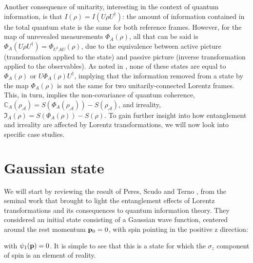 \documentclass[12pt,a4paper,notitlepage]{report}
\begin{document}

Another consequence of unitarity, interesting in the context of quantum information, is that $I(\rho) = I(U\rho U^\dagger)$: the amount of information contained in the total quantum state is the same for both reference frames. However, for the map of unrevealed measurements $\Phi_A(\rho)$, all that can be said is $\Phi_A(U\rho U^\dagger) = \Phi_{U^\dagger AU}(\rho)$, due to the equivalence between active picture (transformation applied to the state) and passive picture (inverse transformation applied to the observables). As noted in \cite{savi_angelo_2021}, none of these states are equal to $\Phi_A(\rho)$ or $U\Phi_A(\rho)U^\dagger$, implying that the information removed from a state by the map $\Phi_A(\rho)$ is not the same for two unitarily-connected Lorentz frames. This, in turn, implies the non-covariance of quantum coherence, $\mathbb{C}_A(\rho_\mathcal{A}) = S(\Phi_A(\rho_\mathcal{A})) - S(\rho_\mathcal{A})$, and irreality, $\mathfrak{I}_A(\rho) = S(\Phi_A(\rho)) - S(\rho)$. To gain further insight into how entanglement and irreality are affected by Lorentz transformations, we will now look into specific case studies.

\section{Gaussian state}

We will start by reviewing the result of Peres, Scudo and Terno \cite{peres2002}, from the seminal work that brought to light the entanglement effects of Lorentz transformations and its consequences to quantum information theory. They considered an initial state consisting of a Gaussian wave function, centered around the rest momentum $\vb{p}_0 = 0$, with spin pointing in the positive z direction:

%
with $\psi_1(\vb{p}) = 0$. It is simple to see that this is a state for which the $\sigma_z$ component of spin is an element of reality.
\end{document}
